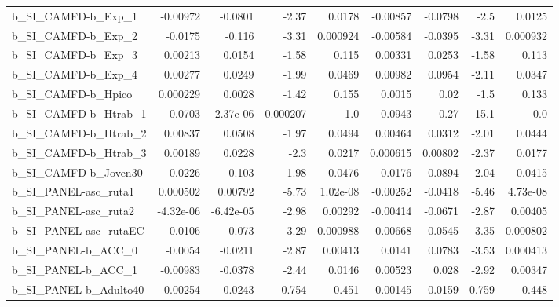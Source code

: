 \begin{tabular}{lrrrrrrrr}
b\_SI\_CAMFD-b\_Exp\_1         &    -0.00972 &      -0.0801 &     -2.37 &   0.0178 &   -0.00857 &     -0.0798 &         -2.5 &        0.0125 \\
b\_SI\_CAMFD-b\_Exp\_2         &     -0.0175 &       -0.116 &     -3.31 & 0.000924 &   -0.00584 &     -0.0395 &        -3.31 &      0.000932 \\
b\_SI\_CAMFD-b\_Exp\_3         &     0.00213 &       0.0154 &     -1.58 &    0.115 &    0.00331 &      0.0253 &        -1.58 &         0.113 \\
b\_SI\_CAMFD-b\_Exp\_4         &     0.00277 &       0.0249 &     -1.99 &   0.0469 &    0.00982 &      0.0954 &        -2.11 &        0.0347 \\
b\_SI\_CAMFD-b\_Hpico         &    0.000229 &       0.0028 &     -1.42 &    0.155 &     0.0015 &        0.02 &         -1.5 &         0.133 \\
b\_SI\_CAMFD-b\_Htrab\_1       &     -0.0703 &    -2.37e-06 &  0.000207 &      1.0 &    -0.0943 &       -0.27 &         15.1 &           0.0 \\
b\_SI\_CAMFD-b\_Htrab\_2       &     0.00837 &       0.0508 &     -1.97 &   0.0494 &    0.00464 &      0.0312 &        -2.01 &        0.0444 \\
b\_SI\_CAMFD-b\_Htrab\_3       &     0.00189 &       0.0228 &      -2.3 &   0.0217 &   0.000615 &     0.00802 &        -2.37 &        0.0177 \\
b\_SI\_CAMFD-b\_Joven30       &      0.0226 &        0.103 &      1.98 &   0.0476 &     0.0176 &      0.0894 &         2.04 &        0.0415 \\
b\_SI\_PANEL-asc\_ruta1       &    0.000502 &      0.00792 &     -5.73 & 1.02e-08 &   -0.00252 &     -0.0418 &        -5.46 &      4.73e-08 \\
b\_SI\_PANEL-asc\_ruta2       &   -4.32e-06 &    -6.42e-05 &     -2.98 &  0.00292 &   -0.00414 &     -0.0671 &        -2.87 &       0.00405 \\
b\_SI\_PANEL-asc\_rutaEC      &      0.0106 &        0.073 &     -3.29 & 0.000988 &    0.00668 &      0.0545 &        -3.35 &      0.000802 \\
b\_SI\_PANEL-b\_ACC\_0         &     -0.0054 &      -0.0211 &     -2.87 &  0.00413 &     0.0141 &      0.0783 &        -3.53 &      0.000413 \\
b\_SI\_PANEL-b\_ACC\_1         &    -0.00983 &      -0.0378 &     -2.44 &   0.0146 &    0.00523 &       0.028 &        -2.92 &       0.00347 \\
b\_SI\_PANEL-b\_Adulto40      &    -0.00254 &      -0.0243 &     0.754 &    0.451 &   -0.00145 &     -0.0159 &        0.759 &         0.448 \\

\end{tabular}
